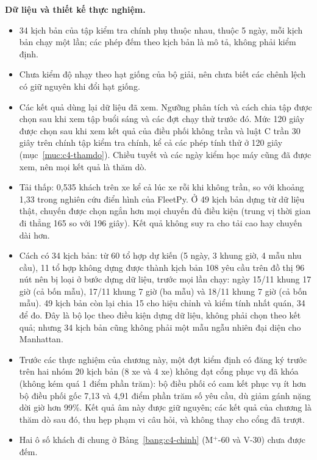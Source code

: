 \textbf{Dữ liệu và thiết kế thực nghiệm.}
\begin{itemize}[leftmargin=1.2cm,itemsep=2pt,topsep=3pt]
\item 34 kịch bản của tập kiểm tra chính phụ thuộc nhau, thuộc 5 ngày, mỗi kịch bản chạy một lần; các phép đếm theo
kịch bản là mô tả, không phải kiểm định.
\item Chưa kiểm độ nhạy theo hạt giống của bộ giải, nên chưa biết các chênh lệch có giữ nguyên khi đổi hạt giống.
\item Các kết quả dùng lại dữ liệu đã xem. Ngưỡng phân tích và cách chia tập được chọn sau khi xem tập buổi sáng và các
đợt chạy thử trước đó. Mức 120 giây được chọn sau khi xem kết quả của điều phối không trần và luật C trần 30 giây trên
chính tập kiểm tra chính, kể cả các phép tính thử ở 120 giây (mục~\ref{muc:c4-thamdo}). Chiều tuyết và các ngày kiểm học máy cũng đã được xem, nên mọi kết quả là thăm dò.
\item Tải thấp: 0,535 khách trên xe kể cả lúc xe rỗi khi không trần, so với khoảng 1,33 trong nghiên cứu điển hình của
FleetPy. Ở 49 kịch bản dựng từ dữ liệu thật, chuyến được chọn ngắn hơn mọi chuyến đủ điều kiện (trung vị thời gian đi thẳng 165
so với 196 giây). Kết quả không suy ra cho tải cao hay chuyến dài hơn.
\item Cách có 34 kịch bản: từ 60 tổ hợp dự kiến (5 ngày, 3 khung giờ, 4 mẫu nhu cầu), 11 tổ hợp không dựng được thành kịch
bản 108 yêu cầu trên đồ thị 96 nút nên bị loại ở bước dựng dữ liệu, trước mọi lần chạy: ngày 15/11 khung 17 giờ (cả bốn
mẫu), 17/11 khung 7 giờ (ba mẫu) và 18/11 khung 7 giờ (cả bốn mẫu). 49 kịch bản còn lại chia 15 cho hiệu chỉnh và kiểm
tính nhất quán, 34 để đo. Đây là bộ lọc theo điều kiện dựng dữ liệu, không phải chọn theo kết quả; nhưng 34 kịch bản
cũng không phải một mẫu ngẫu nhiên đại diện cho Manhattan.
\item Trước các thực nghiệm của chương này, một đợt kiểm định có đăng ký trước trên hai nhóm 20 kịch bản (8 xe và 4 xe)
không đạt cổng phục vụ đã khóa (không kém quá 1 điểm phần trăm): bộ điều phối có cam kết phục vụ ít hơn bộ điều phối gốc
7,13 và 4,91 điểm phần trăm số yêu cầu, dù giảm gánh nặng dời giờ hơn 99\%. Kết quả âm này được giữ nguyên; các kết quả
của chương là thăm dò sau đó, thu hẹp phạm vi câu hỏi, và không thay cho cổng đã trượt.
\item Hai ô số khách đi chung ở Bảng~\ref{bang:c4-chinh} (M$^{+}$-60 và V-30) chưa được đếm.
\end{itemize}

